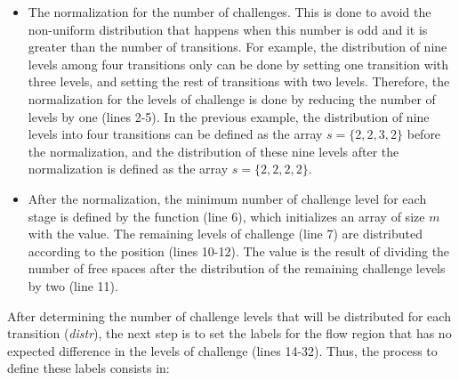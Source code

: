 \begin{itemize}
\item
The normalization for the number of challenges. This is done to avoid the non-uniform distribution that happens when this number is odd and it is greater than the number of transitions. For example, the distribution of nine levels among four transitions only can be done by setting one transition with three levels, and setting the rest of transitions with two levels. Therefore, the normalization for the levels of challenge is done by reducing the number of levels by one (lines 2-5). In the previous example, the distribution of nine levels into four transitions can be defined as the array $s = \{2, 2, 3, 2\}$ before the normalization, and the distribution of these nine levels after the normalization is defined as the array $s = \{2, 2, 2, 2\}$.
\item
After the normalization, the minimum number of challenge level for each stage is defined by the function  (line 6), which initializes an array of size $m$ with the value. The remaining levels of challenge (line 7) are distributed according to the position  (lines 10-12). The value  is the result of dividing the number of free spaces after the distribution of the remaining challenge levels by two (line 11).
\end{itemize}

After determining the number of challenge levels that will be distributed for each transition (\emph{distr}), the next step is to set the labels for the flow region that has no expected difference in the levels of challenge (lines 14-32). Thus, the process to define these labels consists in:


